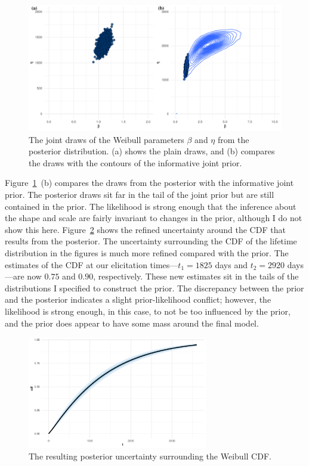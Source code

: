 \begin{figure}
  \centering
  \includegraphics[width=1\textwidth]{./figures/ch-3/idler-frame-post.pdf}
  \caption{The joint draws of the Weibull parameters $\beta$ and $\eta$ from the posterior distribution. (a) shows the plain draws, and (b) compares the draws with the contours of the informative joint prior.}
  \label{fig:idler-frames-post}
\end{figure}

Figure~\ref{fig:idler-frames-post}~(b) compares the draws from the posterior with the informative joint prior. The posterior draws sit far in the tail of the joint prior but are still contained in the prior. The likelihood is strong enough that the inference about the shape and scale are fairly invariant to changes in the prior, although I do not show this here. Figure~\ref{fig:idler-frames-post-cdf} shows the refined uncertainty around the CDF that results from the posterior. The uncertainty surrounding the CDF of the lifetime distribution in the figures is much more refined compared with the prior. The estimates of the CDF at our elicitation times---$t_1 = 1825$ days and $t_2 = 2920$ days---are now $0.75$ and $0.90$, respectively. These new estimates sit in the tails of the distributions I specified to construct the prior. The discrepancy between the prior and the posterior indicates a slight prior-likelihood conflict; however, the likelihood is strong enough, in this case, to not be too influenced by the prior, and the prior does appear to have some mass around the final model.
\marginnote{\small{\textcolor{red}{Link this to next section.}}}
\begin{figure}
  \centering
  \includegraphics[width=0.7\textwidth]{./figures/ch-3/idler-frame-post-CDF.pdf}
  \caption{The resulting posterior uncertainty surrounding the Weibull CDF.}
  \label{fig:idler-frames-post-cdf}
\end{figure}

